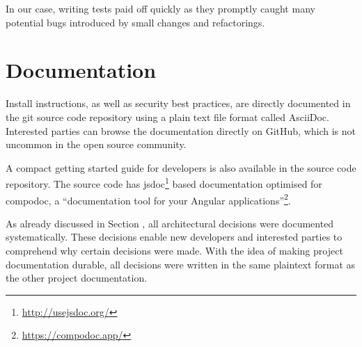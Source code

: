In our case, writing tests paid off quickly as they promptly caught many potential bugs introduced by small changes and refactorings.

\section{Documentation}

Install instructions, as well as security best practices, are directly documented in the git source code repository using a plain text file format called AsciiDoc.
Interested parties can browse the documentation directly on GitHub, which is not uncommon in the open source community.

A compact getting started guide for developers is also available in the source code repository.
The source code has jsdoc\footnote{\url{http://usejsdoc.org/}} based documentation optimised for compodoc, a ``documentation tool for your Angular applications''\footnote{\url{https://compodoc.app/}}.

As already discussed in Section , all architectural decisions were documented systematically.
These decisions enable new developers and interested parties to comprehend why certain decisions were made.
With the idea of making project documentation durable, all decisions were written in the same plaintext format as the other project documentation.
